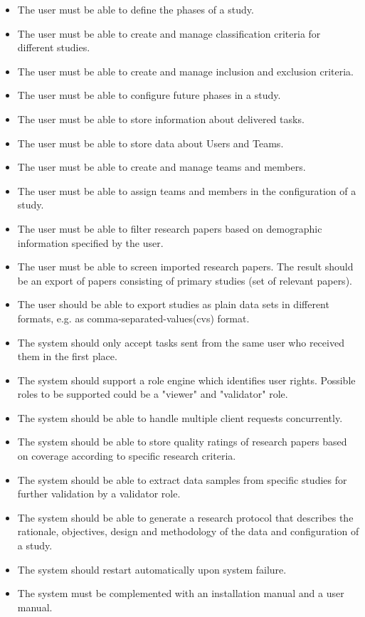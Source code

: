\begin{itemize}
\item The user must be able to define the phases of a study. 
\item The user must be able to create and manage classification criteria for different studies.
\item The user must be able to create and manage inclusion and exclusion criteria.
\item The user must be able to configure future phases in a study.
\item The user must be able to store information about delivered tasks.
\item The user must be able to store data about Users and Teams.
\item The user must be able to create and manage teams and members.
\item The user must be able to assign teams and members in the configuration of a study. 
\item The user must be able to filter research papers based on demographic information specified by the user. 
\item The user must be able to screen imported research papers. The result should be an export of papers consisting of primary studies (set of relevant papers). 
\item The user should be able to export studies as plain data sets in different formats, e.g. as comma-separated-values(cvs) format. 
\item The system should only accept tasks sent from the same user who received them in the first place. 
\item The system should support a role engine which identifies user rights. Possible roles to be supported could be a "viewer" and "validator" role. 
\item The system should be able to handle multiple client requests concurrently. 
\item The system should be able to store quality ratings of research papers based on coverage according to specific research criteria.
\item The system should be able to extract data samples from specific studies for further validation by a validator role.
\item The system should be able to generate a research protocol that describes the rationale, objectives, design and methodology of the data and configuration of a study. 
\item The system should restart automatically upon system failure.
\item The system must be complemented with an installation manual and a user manual.
\end{itemize}


